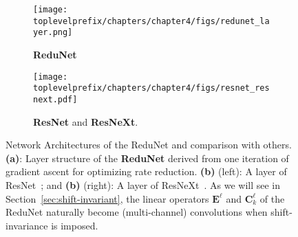 \documentclass[\toplevelprefix/book-main.tex]{subfiles}
\begin{document}
\begin{figure}[t]
    \begin{subfigure}[t]{0.35\textwidth}
        \centering
        \texttt{[image: \\toplevelprefix/chapters/chapter4/figs/redunet\_layer.png]}
        \caption{\textbf{ReduNet}}
    \end{subfigure}
    \hfill 
    \begin{subfigure}[t]{0.6\textwidth}
        \centering
        \texttt{[image: \\toplevelprefix/chapters/chapter4/figs/resnet\_resnext.pdf]}
        \caption{\textbf{ResNet} and \textbf{ResNeXt}.}
    \end{subfigure}
    \caption{\small Network Architectures of the ReduNet and comparison with others. \textbf{(a)}: Layer structure of the \textbf{ReduNet} derived from one iteration of gradient ascent for optimizing rate reduction. \textbf{(b)} (left): A layer of ResNet~\cite{he2016deep}; and \textbf{(b)} (right): A layer of ResNeXt~\cite{ResNEXT}. As we will see in Section~\ref{sec:shift-invariant}, the linear operators $\bm E^\ell$ and $\bm{C}_k^\ell$ of the ReduNet naturally become (multi-channel) convolutions when shift-invariance is imposed.}
    \label{fig:arch-ReduNet}
\end{figure}
\end{document}
